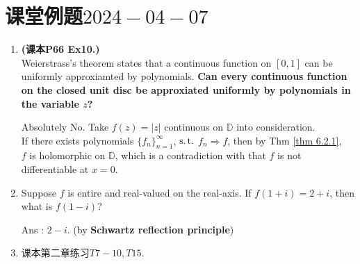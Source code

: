 \newpage

\section{课堂例题$2024-04-07$}
\begin{enumerate}
	\item \textbf{(课本P66 Ex10.)}\\
	Weierstrass's theorem states that a continuous function on $[0 , 1]$ can be uniformly approxiamted by polynomials. \textbf{Can every continuous function on the closed unit disc be approxiated uniformly by polynomials in the variable $z$?}
	
	\vspace{2em}
	
	\begin{solution}
		Absolutely No. Take $f(z) = \left| z \right|$ continuous on $\mathbb{D}$ into consideration. \\
		If there exists polynomials $\{ f_n \}_{n = 1}^{\infty}$, $\operatorname{s.t.}$ $f_n \Rightarrow f$, then by Thm \ref{thm 6.2.1}, \\
		$f$ is holomorphic on $\mathbb{D}$, which is a contradiction with that $f$ is not differentiable at $x = 0$.
	\end{solution}
	
	\vspace{2em}
	
	\item Suppose $f$ is entire and real-valued on the real-axis. If $f(1 + i) = 2 + i$, then what is $f(1 - i)$?
	
	\vspace{2em}
	
	\begin{solution}
		Ans : $2 - i$. (by \textbf{Schwartz reflection principle})
	\end{solution}
	
	\vspace{2em}
	
	\item 课本第二章练习$T7-10 , T15$.
\end{enumerate}






	\ifx\allfiles\undefined

\fi